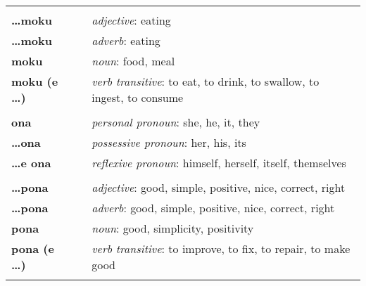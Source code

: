 \begin{supertabular}{p{2,5cm}|ll}
                            &  &                                                                                                         \\
    \textbf{\dots moku}     &  & \textit{adjective}: eating                                                                              \\
    \textbf{\dots moku}     &  & \textit{adverb}: eating                                                                                 \\
    \textbf{moku}           &  & \textit{noun}: food, meal                                                                               \\
    \textbf{moku (e \dots)} &  & \textit{verb transitive}: to eat, to drink, to swallow, to ingest, to consume                           \\
                            &  &                                                                                                         \\
    \textbf{ona}            &  & \textit{personal pronoun}: she, he, it, they                                                            \\
    \textbf{\dots ona}      &  & \textit{possessive pronoun}: her, his, its                                                              \\
    \textbf{\dots e ona}    &  & \textit{reflexive pronoun}: himself, herself, itself, themselves                                        \\
                            &  &                                                                                                         \\
    \textbf{\dots pona}     &  & \textit{adjective}: good, simple, positive, nice, correct, right                                        \\
    \textbf{\dots pona}     &  & \textit{adverb}: good, simple, positive, nice, correct, right                                           \\
    \textbf{pona}           &  & \textit{noun}: good, simplicity, positivity                                                             \\
    \textbf{pona (e \dots)} &  & \textit{verb transitive}: to improve, to fix, to repair, to make good                                   \\
                            &  &                                                                                                         \\

\end{supertabular}
